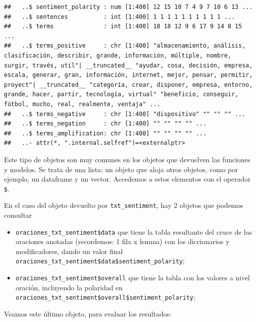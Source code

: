 \documentclass[
]{book}
\newenvironment{Shaded}{\begin{snugshade}}{\end{snugshade}}
\newcommand{\AttributeTok}[1]{\textcolor[rgb]{0.77,0.63,0.00}{#1}}
\newcommand{\DecValTok}[1]{\textcolor[rgb]{0.00,0.00,0.81}{#1}}
\newcommand{\FunctionTok}[1]{\textcolor[rgb]{0.00,0.00,0.00}{#1}}
\newcommand{\NormalTok}[1]{#1}
\newcommand{\SpecialCharTok}[1]{\textcolor[rgb]{0.00,0.00,0.00}{#1}}
\newcommand{\StringTok}[1]{\textcolor[rgb]{0.31,0.60,0.02}{#1}}
\providecommand{\tightlist}{%
  \setlength{\itemsep}{0pt}\setlength{\parskip}{0pt}}
\begin{document}
\begin{verbatim}
##   ..$ sentiment_polarity : num [1:400] 12 15 10 7 4 9 7 10 6 13 ...
##   ..$ sentences          : int [1:400] 1 1 1 1 1 1 1 1 1 1 ...
##   ..$ terms              : int [1:400] 18 18 12 9 6 17 9 14 8 15 ...
##   ..$ terms_positive     : chr [1:400] "almacenamiento, análisis, clasificación, describir, grande, información, múltiple, nombre, surgir, través, util"| __truncated__ "ayudar, cosa, decisión, empresa, escala, generar, gran, información, internet, mejor, pensar, permitir, proyect"| __truncated__ "categoría, crear, disponer, empresa, entorno, grande, hacer, partir, tecnología, virtual" "beneficio, conseguir, fútbol, mucho, real, realmente, ventaja" ...
##   ..$ terms_negative     : chr [1:400] "dispositivo" "" "" "" ...
##   ..$ terms_negation     : chr [1:400] "" "" "" "" ...
##   ..$ terms_amplification: chr [1:400] "" "" "" "" ...
##   ..- attr(*, ".internal.selfref")=<externalptr>
\end{verbatim}

Este tipo de objetos son muy comunes en los objetos que devuelven las funciones y modelos. Se trata de una lista: un objeto que aloja otros objetos, como por ejemplo, un dataframe y un vector. Accedemos a estos elementos con el operador \texttt{\$}.

En el caso del objeto devuelto por \texttt{txt\_sentiment}, hay 2 objetos que podemos consultar

\begin{itemize}
\tightlist
\item
  \texttt{oraciones\_txt\_sentiment\$data} que tiene la tabla resultante del cruce de las oraciones anotadas (recordemos: 1 fila x lemma) con los diccionarios y modificadores, dando un valor final \texttt{oraciones\_txt\_sentiment\$data\$sentiment\_polarity};
\item
  \texttt{oraciones\_txt\_sentiment\$overall} que tiene la tabla con los valores a nivel oración, incluyendo la polaridad en \texttt{oraciones\_txt\_sentiment\$overall\$sentiment\_polarity};
\end{itemize}

Veamos este último objeto, para evaluar los resultados:

\begin{Shaded}
\end{Shaded}
\end{document}

